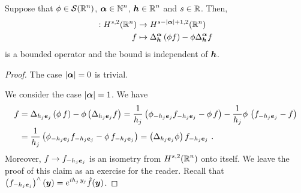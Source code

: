 \begin{prop} \label{ell_reg_prop1}
Suppose that $\displaystyle \phi \in \mathcal{S}(\mathbb{R}^n)$,
$\displaystyle {\bm{\alpha}} \in \mathbb{N}^n$, $\displaystyle {\bm{h}}\in \mathbb{R}^n$
and $s \in \mathbb{R}$.  Then,
\begin{align*}
[\Delta^{\VEC{\alpha}}_{\VEC{h}}, \phi]: H^{s,2}(\RR^n) &\rightarrow 
H^{s-|\VEC{\alpha}|+1,2}(\RR^n) \\
f &\mapsto \Delta^{\VEC{\alpha}}_{\VEC{h}} \left( \phi f \right) -
\phi \Delta^{\VEC{\alpha}}_\VEC{h} f
\end{align*}
is a bounded operator and the bound is independent of ${\bm{h}}$.
\end{prop}

\begin{proof}
The case $|{\bm{\alpha}}|=0$ is trivial.
  
 We consider the case $|{\bm{\alpha}}|=1$.  We have
\begin{align*}
[\Delta_{h_j\VEC{e}_j},\phi] f
&= \Delta_{h_j\VEC{e}_j} \left( \phi\, f \right) -
\phi \left( \Delta_{h_j\VEC{e}_j} f \right)
= \frac{1}{h_j} \left( \phi_{-h_j\VEC{e}_j} f_{-h_j\VEC{e}_j}
- \phi\, f \right)
- \frac{1}{h_j} \phi \,\left( f_{-h_j\VEC{e}_j} - f \right) \\
&= \frac{1}{h_j} \left( \phi_{-h_j\VEC{e}_j} f_{-h_j\VEC{e}_j}
- \phi \, f_{-h_j\VEC{e}_j} \right)
= \left( \Delta_{h_j\VEC{e}_j} \phi \right) f_{-h_j\VEC{e}_j} \ .
\end{align*}
Moreover, $\displaystyle f \to f_{-h_j{\bm{e}}_j}$ is an isometry from
$\displaystyle H^{s,2}(\mathbb{R}^n)$ onto itself. We leave the proof of this
claim as an exercise for the reader.  Recall that
$\displaystyle \left(f_{-h_j{\bm{e}}_j}\right)^\wedge({\bm{y}}) = e^{i h_j\,y_j}
\hat{f}({\bm{y}})$.


\end{proof}
